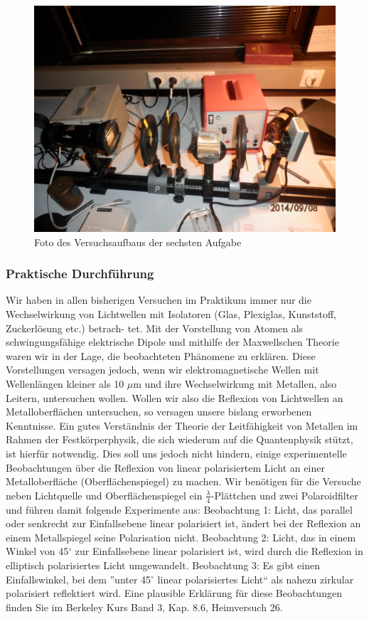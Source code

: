 \documentclass[12pt]{scrartcl}
\begin{document}
\begin{figure}[H]
\centering
    \includegraphics[scale = 0.1]{aufgabe_6.JPG}
  	\caption[Foto des Versuchsaufbaus der sechsten Aufgabe]{Foto des Versuchsaufbaus der sechsten Aufgabe}
  \label{fig:aufgabe_2}
\end{figure}

\subsubsection{Praktische Durchführung}
Wir haben in allen bisherigen Versuchen im Praktikum immer nur die Wechselwirkung
von Lichtwellen mit Isolatoren (Glas, Plexiglas, Kunststoff, Zuckerlösung etc.) betrach-
tet. Mit der Vorstellung von Atomen als schwingungsfähige elektrische Dipole und mithilfe der Maxwellschen Theorie waren wir in der Lage, die beobachteten Phänomene zu erklären. Diese Vorstellungen versagen jedoch, wenn wir elektromagnetische Wellen mit Wellenlängen kleiner als 10 $\mu$m und ihre Wechselwirkung mit Metallen, also Leitern, untersuchen wollen. Wollen wir also die Reflexion von Lichtwellen an Metalloberflächen untersuchen, so versagen unsere bislang erworbenen Kenntnisse. Ein gutes Verständnis der Theorie der Leitfähigkeit von Metallen im Rahmen der Festkörperphysik, die sich wiederum auf die Quantenphysik stützt, ist hierfür notwendig. Dies soll uns jedoch nicht hindern, einige experimentelle Beobachtungen über die Reflexion von linear polarisiertem Licht an einer Metalloberfläche (Oberflächenspiegel) zu machen. Wir benötigen für die Versuche neben Lichtquelle und Oberflächenspiegel ein
$\frac{\lambda}{4}$-Plättchen und zwei Polaroidfilter und
führen damit folgende Experimente aus:
Beobachtung 1: Licht, das parallel oder senkrecht zur Einfallsebene linear polarisiert ist, ändert bei der Reflexion an einem Metallspiegel seine Polarisation nicht.
Beobachtung 2: Licht, das in einem Winkel von 45$^\circ$ zur Einfallsebene linear polarisiert ist, wird durch die Reflexion in elliptisch polarisiertes Licht umgewandelt.
Beobachtung 3: Es gibt einen Einfallswinkel, bei dem
”unter 45$^\circ$
linear polarisiertes
Licht“ als nahezu zirkular polarisiert reflektiert wird.
Eine plausible Erklärung für diese Beobachtungen finden Sie im Berkeley Kurs Band 3, Kap. 8.6, Heimversuch 26.
\end{document}

